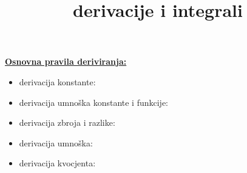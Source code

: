 \documentclass[12pt,oneside,a4paper]{report}
\title{derivacije i integrali}
\begin{document}
\noindent

\begin{center}
\end{center}

\vspace{5mm}
\noindent
\underline{\textbf{Osnovna pravila deriviranja:}}\\
\begin{itemize}
\item derivacija konstante: 
\item derivacija umno\v{s}ka konstante i funkcije: 
\item derivacija zbroja i razlike: 
\item derivacija umno\v{s}ka: 
\hspace{5mm}
\item derivacija kvocjenta: 
\end{itemize}
\end{document}
